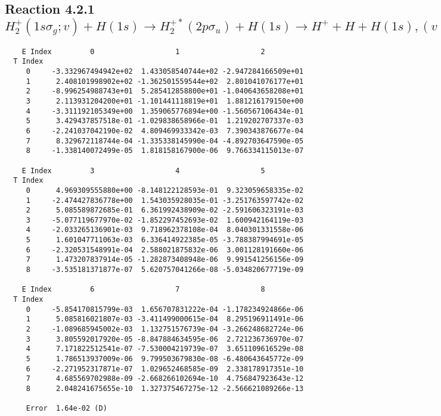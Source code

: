 \documentclass[12pt]{article}
\begin{document}
                               


\newpage
\subsection{
Reaction 4.2.1 $H_2^+(1s\sigma_g;v) + H(1s) \rightarrow H_2^{+*}(2p\sigma_u) + H(1s) \rightarrow H^+ + H + H(1s), (v=0\ldots 9)$}






%





\begin{small}\begin{verbatim}
    E Index         0                   1                   2
  T Index
     0     -3.332967494942e+02  1.433058540744e+02 -2.947284166509e+01
     1      2.408101998902e+02 -1.362501559544e+02  2.801041076177e+01
     2     -8.996254988743e+01  5.285412858800e+01 -1.040643658208e+01
     3      2.113931204200e+01 -1.101441118819e+01  1.881216179150e+00
     4     -3.311192105349e+00  1.359065776894e+00 -1.560567106434e-01
     5      3.429437857518e-01 -1.029838658966e-01  1.219202707337e-03
     6     -2.241037042190e-02  4.809469933342e-03  7.390343876677e-04
     7      8.329672118744e-04 -1.335338145990e-04 -4.892703647590e-05
     8     -1.338140072499e-05  1.818158167900e-06  9.766334115013e-07

    E Index         3                   4                   5
  T Index
     0      4.969309555880e+00 -8.148122128593e-01  9.323059658335e-02
     1     -2.474427836778e+00  1.543035928035e-01 -3.251763597742e-02
     2      5.085589872685e-01  6.361992438909e-02 -2.591606323191e-03
     3     -5.077119677970e-02 -1.852297452693e-02  1.600942164119e-03
     4     -2.033265136901e-03  9.718962378108e-04  8.040301331558e-06
     5      1.601047711063e-03  6.336414922385e-05 -3.788387994691e-05
     6     -2.320531548991e-04  2.588021875832e-06  3.001128191660e-06
     7      1.473207837914e-05 -1.282873408948e-06  9.991541256156e-09
     8     -3.535181371877e-07  5.620757041266e-08 -5.034820677719e-09

    E Index         6                   7                   8
  T Index
     0     -5.854170815799e-03  1.656707831222e-04 -1.178234924866e-06
     1      5.085816021807e-03 -3.411499000615e-04  8.295196911491e-06
     2     -1.089685945002e-03  1.132751576739e-04 -3.266248682724e-06
     3      3.805592017920e-05 -8.847884634595e-06  2.721236736970e-07
     4      7.171822512541e-07 -7.530004219739e-07  3.651109616529e-08
     5      1.786513937009e-06  9.799503679830e-08 -6.480643645772e-09
     6     -2.271952317871e-07  1.029652468585e-09  2.338178917351e-10
     7      4.685569702988e-09 -2.668266102694e-10  4.756847923643e-12
     8      2.048241675655e-10  1.327375467275e-12 -2.566621089266e-13

     Error  1.64e-02 (D)
\end{verbatim}\end{small}
\end{document}

